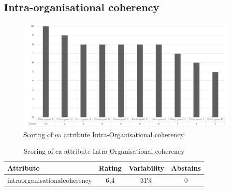 \subsection{Intra-organisational coherency}
\begin{figure}[H]
	\centering
	\includegraphics[width=0.9\linewidth]{images/scoreeaintraorganisationalcoherency}
	\caption[Scoring of \gls{ea} attribute Intra-Organisational coherency]{Scoring of \gls{ea} attribute Intra-Organisational coherency}
	\label{fig:appscoringeaintraorganisationalcoherency}
\end{figure}
\begin{table}[H]
	\centering
	\begin{tabular}{p{}ccc}
		\toprule
		\textbf{Attribute} & \textbf{Rating} & \textbf{Variability} & \textbf{Abstains} \\
		\midrule
		\Gls{intraorganisationalcoherency} & 6,4 & 31\% & 0 \\%
		\bottomrule
	\end{tabular}%
	\caption[Scoring of \gls{ea} attribute Intra-Organisational coherency]{Scoring of \gls{ea} attribute Intra-Organisational coherency}
	\label{tab:appscoringeaintraorganisationalcoherency}%
\end{table}%
\newpage
